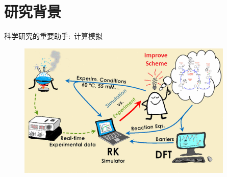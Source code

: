 \section{研究背景}
\begin{frame}{科学研究的重要助手:~计算模拟}
\begin{figure}[h!]
\vspace*{-0.18in}
\centering
\includegraphics[height=2.55in,width=4.05in]{Figures/Schematic_Material-Design.png}
\label{Schematic_Material-Design}
\end{figure}
\end{frame}

